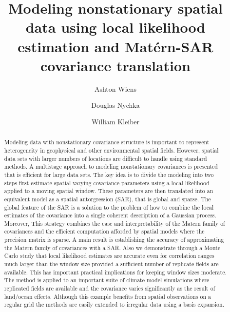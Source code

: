 \documentclass[review]{elsarticle}
\begin{document}
\begin{frontmatter}

\title{Modeling nonstationary spatial data using local likelihood estimation and Mat\'ern-SAR covariance translation}
 
\author[CU]{Ashton Wiens}
\author[CSM]{Douglas Nychka}
\author[CU]{William Kleiber}
\address[CU]{Department of Applied Mathematics, University of Colorado, Boulder, Colorado, USA}
\address[CSM]{Department of Applied Mathematics and Statistics, Colorado School of Mines, Golden, Colorado, USA}

\address{Colorado, United States}

\begin{abstract}

Modeling data with  nonstationary covariance structure is important to represent heterogeneity in geophysical and other environmental spatial fields. However, spatial data sets with larger numbers of locations are difficult to handle using standard methods.  A multistage approach to modeling nonstationary covariances is presented that is efficient for large data sets.  The key idea is to divide the modeling into two steps first estimate spatial varying covariance parameters using a local likelihood applied to a moving spatial window. These parameters are then translated into an equivalent model as a spatial autorgression (SAR),  that is global and sparse. The global feature of the SAR is a solution to the problem of how to combine the local estimates of the covariance into a single coherent description of a Gaussian process.  Moreover, This strategy combines the ease and interpretability of the Matern family of covariances and the efficient computation afforded by spatial models where the precision matrix is sparse. 
A main result is establishing the accuracy of approximating the Matern family of covariances with a SAR. Also we demonstrate 
 through a Monte Carlo study that local likelihood estimates are accurate even for correlation ranges much larger than the window size provided a sufficient number of replicate fields are available.  This has important practical implications for keeping window sizes moderate. 
 The method is applied to an important suite  of climate model simulations where replicated fields are available and the covariance varies significantly as the result of land/ocean effects.  Although this example benefits from spatial observations on a regular grid the methods are easily extended to irregular data using a basis expansion. 


\end{abstract}
\end{frontmatter}
\end{document}
